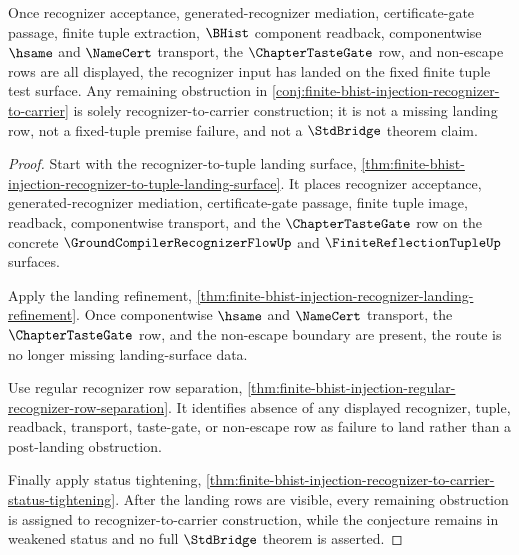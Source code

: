 \begin{theorem}
\label{thm:finite-bhist-injection-recognizer-landing-close}
Once recognizer acceptance, generated-recognizer mediation, certificate-gate passage, finite tuple extraction, $\BHist$ component readback, componentwise $\hsame$ and $\NameCert$ transport, the $\ChapterTasteGate$ row, and non-escape rows are all displayed, the recognizer input has landed on the fixed finite tuple test surface. Any remaining obstruction in \autoref{conj:finite-bhist-injection-recognizer-to-carrier} is solely recognizer-to-carrier construction; it is not a missing landing row, not a fixed-tuple premise failure, and not a $\StdBridge$ theorem claim.
\end{theorem}
\begin{proof}
Start with the recognizer-to-tuple landing surface, \autoref{thm:finite-bhist-injection-recognizer-to-tuple-landing-surface}. It places recognizer acceptance, generated-recognizer mediation, certificate-gate passage, finite tuple image, readback, componentwise transport, and the $\ChapterTasteGate$ row on the concrete $\GroundCompilerRecognizerFlowUp$ and $\FiniteReflectionTupleUp$ surfaces.

Apply the landing refinement, \autoref{thm:finite-bhist-injection-recognizer-landing-refinement}. Once componentwise $\hsame$ and $\NameCert$ transport, the $\ChapterTasteGate$ row, and the non-escape boundary are present, the route is no longer missing landing-surface data.

Use regular recognizer row separation, \autoref{thm:finite-bhist-injection-regular-recognizer-row-separation}. It identifies absence of any displayed recognizer, tuple, readback, transport, taste-gate, or non-escape row as failure to land rather than a post-landing obstruction.

Finally apply status tightening, \autoref{thm:finite-bhist-injection-recognizer-to-carrier-status-tightening}. After the landing rows are visible, every remaining obstruction is assigned to recognizer-to-carrier construction, while the conjecture remains in weakened status and no full $\StdBridge$ theorem is asserted.
\end{proof}

